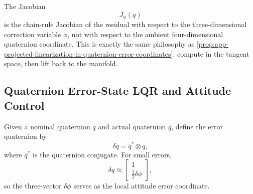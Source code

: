 \begin{algorithm}[H]
	\DontPrintSemicolon
	\caption{Gauss--Newton for Wahba's Problem in Quaternion Coordinates}
\label{alg:app-gauss-newton-for-wahba-s-problem-in-quaternion-coordinates}
\end{algorithm}

\begin{remark}
	The Jacobian
	\[
		J_\phi(q)
	\]
	is the chain-rule Jacobian of the residual with respect to the three-dimensional correction variable $\phi$, not with respect to the ambient four-dimensional quaternion coordinate. This is exactly the same philosophy as \autoref{prop:app-projected-linearization-in-quaternion-error-coordinates}: compute in the tangent space, then lift back to the manifold.
\end{remark}

\subsection{Quaternion Error-State LQR and Attitude Control}
\label{sec:app-quaternion-error-state-lqr-and-attitude-control}

\begin{definition}\label{def:app-quaternion-error-state}
	Given a nominal quaternion $\bar q$ and actual quaternion $q$, define the error quaternion by
	\[
		\delta q = \bar q^\ast \otimes q,
	\]
	where $\bar q^\ast$ is the quaternion conjugate. For small errors,
	\[
		\delta q
		\approx
		\begin{bmatrix}
			1 \\
			\frac{1}{2}\delta \phi
		\end{bmatrix},
	\]
	so the three-vector $\delta \phi$ serves as the local attitude error coordinate.
\end{definition}

